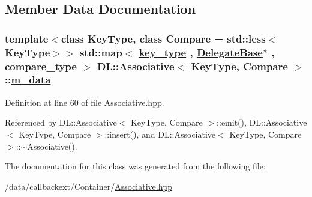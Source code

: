 \subsection{Member Data Documentation}
\hypertarget{classDL_1_1Associative_r0}{
\subsubsection[m\_\-data]{\setlength{\rightskip}{0pt plus 5cm}template$<$class Key\-Type, class Compare = std::less$<$Key\-Type$>$$>$ std::map$<$ \hyperlink{classDL_1_1Associative_w1}{key\_\-type} , \hyperlink{classDL_1_1DelegateBase}{Delegate\-Base}$\ast$ , \hyperlink{classDL_1_1Associative_w0}{compare\_\-type} $>$ \hyperlink{classDL_1_1Associative}{DL::Associative}$<$ Key\-Type, Compare $>$::\hyperlink{classDL_1_1Associative_r0}{m\_\-data}}}
\label{classDL_1_1Associative_r0}




Definition at line 60 of file Associative.hpp.

Referenced by DL::Associative$<$ Key\-Type, Compare $>$::emit(), DL::Associative$<$ Key\-Type, Compare $>$::insert(), and DL::Associative$<$ Key\-Type, Compare $>$::$\sim$Associative().

The documentation for this class was generated from the following file:\begin{CompactItemize}
\item 
/data/callbackext/Container/\hyperlink{Associative_8hpp}{Associative.hpp}\end{CompactItemize}
